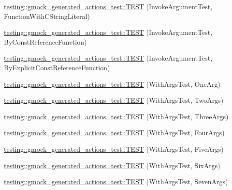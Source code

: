 \begin{DoxyCompactItemize}
\mbox{\hyperlink{namespacetesting_1_1gmock__generated__actions__test_a698f1a80b7fed18141fd170524908885}{testing\+::gmock\+\_\+generated\+\_\+actions\+\_\+test\+::\+T\+E\+ST}} (Invoke\+Argument\+Test, Function\+With\+C\+String\+Literal)
\item 
\mbox{\hyperlink{namespacetesting_1_1gmock__generated__actions__test_a82aff636cad2f441c584fc8e3c057d56}{testing\+::gmock\+\_\+generated\+\_\+actions\+\_\+test\+::\+T\+E\+ST}} (Invoke\+Argument\+Test, By\+Const\+Reference\+Function)
\item 
\mbox{\hyperlink{namespacetesting_1_1gmock__generated__actions__test_accb544431629bfb38a618343daaa54c2}{testing\+::gmock\+\_\+generated\+\_\+actions\+\_\+test\+::\+T\+E\+ST}} (Invoke\+Argument\+Test, By\+Explicit\+Const\+Reference\+Function)
\item 
\mbox{\hyperlink{namespacetesting_1_1gmock__generated__actions__test_ae6ef9e9d09c01cd0699a3044fd8c3f1f}{testing\+::gmock\+\_\+generated\+\_\+actions\+\_\+test\+::\+T\+E\+ST}} (With\+Args\+Test, One\+Arg)
\item 
\mbox{\hyperlink{namespacetesting_1_1gmock__generated__actions__test_afadf90d2d0acc55906bfd7f0f43f8a04}{testing\+::gmock\+\_\+generated\+\_\+actions\+\_\+test\+::\+T\+E\+ST}} (With\+Args\+Test, Two\+Args)
\item 
\mbox{\hyperlink{namespacetesting_1_1gmock__generated__actions__test_acae0920fc83b3990663b9d448b8bfd9a}{testing\+::gmock\+\_\+generated\+\_\+actions\+\_\+test\+::\+T\+E\+ST}} (With\+Args\+Test, Three\+Args)
\item 
\mbox{\hyperlink{namespacetesting_1_1gmock__generated__actions__test_ab7046e566f75756b6fe1ec4d92ff7c2b}{testing\+::gmock\+\_\+generated\+\_\+actions\+\_\+test\+::\+T\+E\+ST}} (With\+Args\+Test, Four\+Args)
\item 
\mbox{\hyperlink{namespacetesting_1_1gmock__generated__actions__test_ab51a43ea1c760e001330400d6cec5bfc}{testing\+::gmock\+\_\+generated\+\_\+actions\+\_\+test\+::\+T\+E\+ST}} (With\+Args\+Test, Five\+Args)
\item 
\mbox{\hyperlink{namespacetesting_1_1gmock__generated__actions__test_a167731ec11d5cf4135d95b01dc59e223}{testing\+::gmock\+\_\+generated\+\_\+actions\+\_\+test\+::\+T\+E\+ST}} (With\+Args\+Test, Six\+Args)
\item 
\mbox{\hyperlink{namespacetesting_1_1gmock__generated__actions__test_a04970f4db4de11d91e59ae8769dccea1}{testing\+::gmock\+\_\+generated\+\_\+actions\+\_\+test\+::\+T\+E\+ST}} (With\+Args\+Test, Seven\+Args)
\item 

\end{DoxyCompactItemize}
